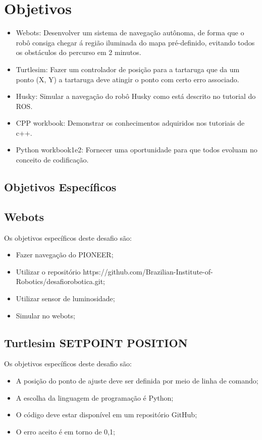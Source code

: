 \section{Objetivos}
\label{sec:obj}
\begin{itemize}
      \item Webots:
Desenvolver um sistema de navegação autônoma, de forma que o robô consiga chegar 
á região iluminada do mapa pré-definido, evitando todos os obstáculos do percurso em 2 minutos.
      \item Turtlesim:
Fazer um controlador de posição para a tartaruga que da um ponto (X, Y) a tartaruga 
deve atingir o ponto com certo erro associado.
      \item Husky:
Simular a navegação do robô Husky como está descrito no tutorial do ROS.
      \item CPP workbook:
Demonstrar os conhecimentos adquiridos nos tutoriais de c++.
      \item Python workbook1e2:
Fornecer uma oportunidade para que todos evoluam no conceito de codificação.
  \end{itemize}
\subsection{Objetivos Específicos}
\label{ssec:objesp}
\subsection{Webots}
Os objetivos específicos deste desafio são:
\begin{itemize}
      \item Fazer navegação do PIONEER;
      \item Utilizar o repositório https://github.com/Brazilian-Institute-of-Robotics/desafiorobotica.git;
      \item Utilizar sensor de luminosidade;
      \item Simular no webots;
  \end{itemize}
\subsection{Turtlesim SETPOINT POSITION}
Os objetivos específicos deste desafio são:
\begin{itemize}
      \item A posição do ponto de ajuste deve ser definida por meio de linha de comando;
      \item A escolha da linguagem de programação é Python;
      \item O código deve estar disponível em um repositório GitHub;
      \item O erro aceito é em torno de 0,1;
  \end{itemize}
